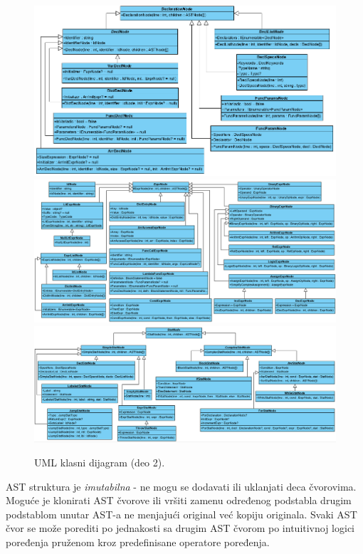 \begin{figure}[h!]
\centering
\includegraphics[scale=0.65]{images/uml/DeclarationNode.png}
\includegraphics[scale=0.55]{images/uml/ExpressionNode.png}
\includegraphics[scale=0.55]{images/uml/StatementNode.png}
\caption{UML klasni dijagram (deo 2).}
\label{fig:UMLASTNode2}
\end{figure}

AST struktura je \emph{imutabilna} - ne mogu se dodavati ili uklanjati deca čvorovima. Moguće je klonirati AST čvorove ili vršiti zamenu određenog podstabla drugim podstablom unutar AST-a ne menjajući original već kopiju originala. Svaki AST čvor se može porediti po jednakosti sa drugim AST čvorom po intuitivnoj logici poređenja pruženom kroz predefinisane operatore poređenja.
